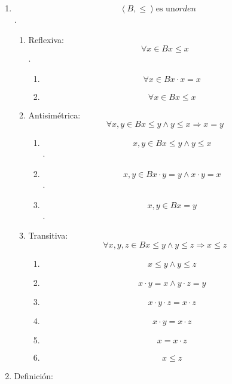 \documentclass[
]{article}
\providecommand{\tightlist}{%
  \setlength{\itemsep}{0pt}\setlength{\parskip}{0pt}}
\begin{document}
\begin{enumerate}
\begin{enumerate}
\begin{enumerate}
      \[\forall x,{y \in B}{x \leq y}\Leftrightarrow{{x \cdot y} = x}\Leftrightarrow{{x + y} = y}\]
    \item
      \[\left\langle {B, \leq} \right\rangle\text{es un}\mathit{orden}\].

      \begin{enumerate}
      \def\labelenumiv{\arabic{enumiv}.}
      \item
        Reflexiva: \[\forall{x \in B}{x \leq x}\].

        \begin{enumerate}
        \def\labelenumv{\arabic{enumv}.}
        \tightlist
        \item
          \[\forall{x \in B}{{x \cdot x} = x}\]
        \item
          \[\forall{x \in B}{x \leq x}\]
        \end{enumerate}
      \item
        Antisimétrica:
        \[\forall x,{y \in B}{{x \leq {y \land y}} \leq x}\Rightarrow{x = y}\]

        \begin{enumerate}
        \def\labelenumv{\arabic{enumv}.}
        \tightlist
        \item
          \[x,{y \in B}{{x \leq {y \land y}} \leq x}\].
        \item
          \[x,{y \in B}{{{x \cdot y} = {{y \land x} \cdot y}} = x}\].
        \item
          \[x,{y \in B}{x = y}\].
        \end{enumerate}
      \item
        Transitiva:
        \[\forall x,y,{z \in B}{{x \leq {y \land y}} \leq z}\Rightarrow{x \leq z}\]

        \begin{enumerate}
        \def\labelenumv{\arabic{enumv}.}
        \tightlist
        \item
          \[{x \leq {y \land y}} \leq z\]
        \item
          \[{{x \cdot y} = {{x \land y} \cdot z}} = y\]
        \item
          \[{{x \cdot y} \cdot z} = {x \cdot z}\]
        \item
          \[{x \cdot y} = {x \cdot z}\]
        \item
          \[x = {x \cdot z}\]
        \item
          \[x \leq z\]
        \end{enumerate}
      \end{enumerate}
    \item
      Definición:


\end{enumerate}
\end{enumerate}
\end{enumerate}
\end{document}
